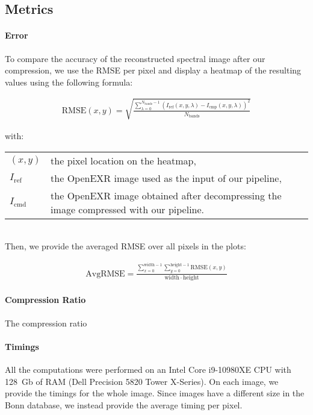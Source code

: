 \subsection{Metrics}

\paragraph{Error}
To compare the accuracy of the reconstructed spectral image after our compression, we use the RMSE per pixel and display a heatmap of the resulting values using the following formula:

\begin{align}
    \mathrm{RMSE}(x, y) = \sqrt{\frac{\sum_{\lambda = 0}^{N_\mathrm{bands} - 1} \left(I_\mathrm{ref}(x, y, \lambda) - I_\mathrm{cmp}(x, y, \lambda) \right)^2}{N_\mathrm{bands}}}
\end{align}

with:

\begin{tabularx}{\linewidth}{lX}
    $(x, y)$ & the pixel location on the heatmap, \\
    $I_\mathrm{ref}$ & the OpenEXR image used as the input of our pipeline, \\
    $I_\mathrm{cmd}$ & the OpenEXR image obtained after decompressing the image compressed with our pipeline. \\
\end{tabularx}\\

Then, we provide the averaged RMSE over all pixels in the plots:

\begin{align}
    \mathrm{AvgRMSE} = \frac{\sum_{x = 0}^{\mathrm{width} - 1} \sum_{y = 0}^{\mathrm{height} - 1} \mathrm{RMSE}(x, y)}{\mathrm{width} \cdot \mathrm{height}}
\end{align}


\paragraph{Compression Ratio}

The compression ratio

\paragraph{Timings}

All the computations were performed on an Intel Core i9-10980XE CPU with 128~Gb of RAM (Dell Precision 5820 Tower X-Series). On each image, we provide the timings for the whole image. Since images have a different size in the Bonn database, we instead provide the average timing per pixel.

\clearpage
